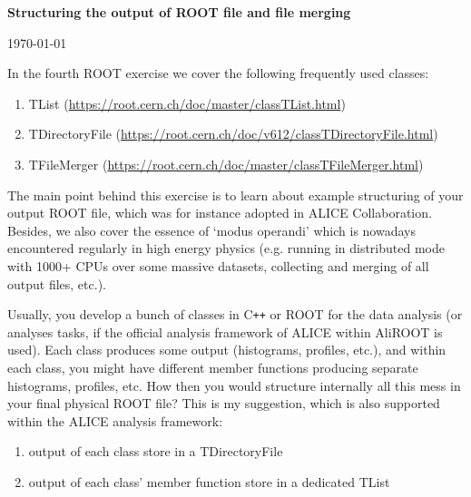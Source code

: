 \documentclass[11pt]{article}
\begin{document}
\begin{center}
\Large{\bf{Structuring the output of ROOT file and file merging}}\\
\end{center}
\begin{center}
{\small\today}
\end{center}

\bigskip

\noindent In the fourth ROOT exercise we cover the following frequently used classes:
%
\begin{enumerate}
\item TList (\url{https://root.cern.ch/doc/master/classTList.html})
\item TDirectoryFile (\url{https://root.cern.ch/doc/v612/classTDirectoryFile.html}) 
\item TFileMerger (\url{https://root.cern.ch/doc/master/classTFileMerger.html}) 
\end{enumerate} 
%

\noindent The main point behind this exercise is to learn about example structuring of your output ROOT file, which was for instance adopted in ALICE Collaboration. Besides, we also cover the essence of `modus operandi' which is nowadays encountered regularly in high energy physics (e.g. running in distributed mode with 1000+ CPUs over some massive datasets, collecting and merging of all output files, etc.).

Usually, you develop a bunch of classes in C\texttt{++} or ROOT for the data analysis (or analyses tasks, if the official analysis framework of ALICE within AliROOT is used). Each class produces some output (histograms, profiles, etc.), and within each class, you might have different member functions producing separate histograms, profiles, etc. How then you would structure internally all this mess in your final physical ROOT file? This is my suggestion, which is also supported within the ALICE analysis framework:
%
\begin{enumerate}
\item output of each class store in a TDirectoryFile
\item output of each class' member function store in a dedicated TList
\end{enumerate}
\end{document}

